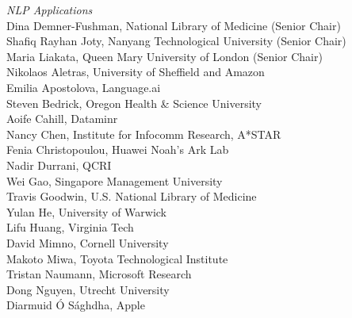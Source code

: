 \emph{NLP Applications} \\
\hspace*{0.2in} Dina Demner-Fushman, National Library of Medicine (Senior Chair)\\
\hspace*{0.2in} Shafiq Rayhan Joty, Nanyang Technological University (Senior Chair)\\
\hspace*{0.2in} Maria Liakata, Queen Mary University of London (Senior Chair)\\
\hspace*{0.2in} Nikolaos Aletras, University of Sheffield and Amazon\\
\hspace*{0.2in} Emilia Apostolova, Language.ai\\
\hspace*{0.2in} Steven Bedrick, Oregon Health \& Science University\\
\hspace*{0.2in} Aoife Cahill, Dataminr\\
\hspace*{0.2in} Nancy Chen, Institute for Infocomm Research, A*STAR\\
\hspace*{0.2in} Fenia Christopoulou, Huawei Noah's Ark Lab\\
\hspace*{0.2in} Nadir Durrani, QCRI\\
\hspace*{0.2in} Wei Gao, Singapore Management University\\
\hspace*{0.2in} Travis Goodwin, U.S. National Library of Medicine\\
\hspace*{0.2in} Yulan He, University of Warwick\\
\hspace*{0.2in} Lifu Huang, Virginia Tech\\
\hspace*{0.2in} David Mimno, Cornell University\\
\hspace*{0.2in} Makoto Miwa, Toyota Technological Institute\\
\hspace*{0.2in} Tristan Naumann, Microsoft Research\\
\hspace*{0.2in} Dong Nguyen, Utrecht University\\
\hspace*{0.2in} Diarmuid Ó S\'aghdha, Apple\\
